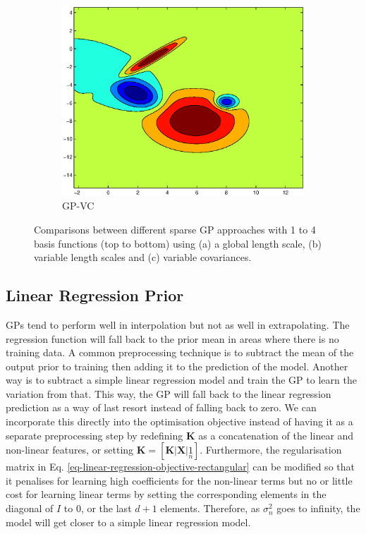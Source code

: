 \documentclass[useAMS,usenatbib,fleqn]{mn2e}
\newcommand{\bm}[1]{\mathbf{#1} }
\begin{document}
\begin{figure}
\begin{subfigure}[b]{0.3\columnwidth}
                \includegraphics[width=\textwidth]{figures/VC4.eps}
                \caption{GP-VC}
        \end{subfigure}
               
        \caption{Comparisons between different sparse GP approaches with 1 to 4 basis functions (top to bottom) using (a) a global length scale, (b) variable length scales and (c) variable covariances.}
        \label{fig-toy-comparison}
\end{figure}


\subsection{Linear Regression Prior}

GPs tend to perform well in interpolation but not as well in extrapolating. The regression function will fall back to the prior mean in areas where there is no training data. A common preprocessing technique is to subtract the mean of the output prior to training then adding it to the prediction of the model. Another way is to subtract a simple linear regression model and train the GP to learn the variation from that. This way, the GP will fall back to the linear regression prediction as a way of last resort instead of falling back to zero. We can incorporate this directly into the optimisation objective instead of having it as a separate preprocessing step by redefining $\bm{K}$ as a concatenation of the linear and non-linear features, or setting $\bm{K}=[\bm{K}|\bm{X}|\underset{n}{1}]$. Furthermore, the regularisation matrix in Eq. \eqref{eq-linear-regression-objective-rectangular} can be modified so that it penalises for learning high coefficients for the non-linear terms but no or little cost for learning linear terms by setting the corresponding elements in the diagonal of $I$ to 0, or the last $d+1$ elements. Therefore, as $\sigma_{n}^{2}$ goes to infinity, the model will get closer to a simple linear regression model.
\end{document}
